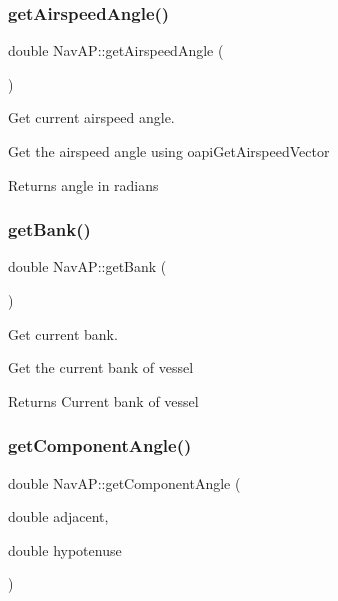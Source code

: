 \subsubsection{\texorpdfstring{get\+Airspeed\+Angle()}{getAirspeedAngle()}}
{\footnotesize\ttfamily double Nav\+A\+P\+::get\+Airspeed\+Angle (\begin{DoxyParamCaption}{ }\end{DoxyParamCaption})\hspace{0.3cm}{\ttfamily [private]}}



Get current airspeed angle. 

Get the airspeed angle using oapi\+Get\+Airspeed\+Vector \begin{DoxyReturn}{Returns}
angle in radians 
\end{DoxyReturn}
\mbox{\label{classNavAP_ab8f7ea8be6de98ec19090322e7920325}} 
\subsubsection{\texorpdfstring{get\+Bank()}{getBank()}}
{\footnotesize\ttfamily double Nav\+A\+P\+::get\+Bank (\begin{DoxyParamCaption}{ }\end{DoxyParamCaption})\hspace{0.3cm}{\ttfamily [private]}}



Get current bank. 

Get the current bank of vessel \begin{DoxyReturn}{Returns}
Current bank of vessel 
\end{DoxyReturn}
\mbox{\label{classNavAP_a5b24e0f32a4068c21a3c2c474c1a9ddd}} 
\subsubsection{\texorpdfstring{get\+Component\+Angle()}{getComponentAngle()}}
{\footnotesize\ttfamily double Nav\+A\+P\+::get\+Component\+Angle (\begin{DoxyParamCaption}\item[{double}]{adjacent,  }\item[{double}]{hypotenuse }\end{DoxyParamCaption})\hspace{0.3cm}{\ttfamily [private]}}



